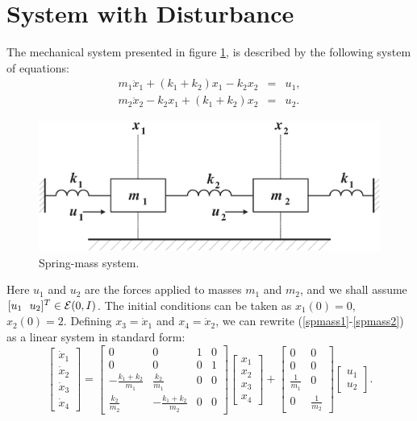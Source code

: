 \documentclass{report}
\newcommand{\EE}{{\cal E}}
\begin{document}
\section{System with Disturbance}
The mechanical system presented in figure \ref{springmassfig}, is described
by the following system of equations:
\begin{eqnarray}
m_1\ddot{x}_1+(k_1+k_2)x_1-k_2x_2 & = & u_1, \label{spmass1}\\
m_2\ddot{x}_2-k_2x_1+(k_1+k_2)x_2 & = & u_2 . \label{spmass2}
\end{eqnarray}
\begin{figure}[htbp]
\centerline{
\includegraphics[height=5 cm]{springmass.eps}}
\caption{Spring-mass system.}
\label{springmassfig}
\end{figure}
Here $u_1$ and $u_2$ are the forces applied to masses $m_1$ and $m_2$,
and we shall assume $[u_1 ~~ u_2]^T\in\EE(0,I)$.
The initial conditions can be taken as $x_1(0)=0$, $x_2(0)=2$.
Defining $x_3=\dot{x}_1$ and $x_4=\dot{x}_2$, we can rewrite
(\ref{spmass1}-\ref{spmass2}) as a linear system in standard form:
\begin{equation}
\left[\begin{array}{c}
\dot{x}_1 \\
\dot{x}_2 \\
\dot{x}_3 \\
\dot{x}_4 \end{array}\right] = \left[\begin{array}{cccc}
0 & 0 & 1 & 0\\
0 & 0 & 0 & 1\\
-\frac{k_1+k_2}{m_1} & \frac{k_2}{m_1} & 0 & 0\\
\frac{k_2}{m_2} & -\frac{k_1+k_2}{m_2} & 0 & 0\end{array}\right]
\left[\begin{array}{c}
x_1 \\
x_2 \\
x_3 \\
x_4 \end{array}\right] + \left[\begin{array}{cc}
0 & 0\\
0 & 0\\
\frac{1}{m_1} & 0\\
0 & \frac{1}{m_2}\end{array}\right]\left[\begin{array}{c}
u_1\\
u_2\end{array}\right]. \label{spmassls}
\end{equation}
\end{document}
